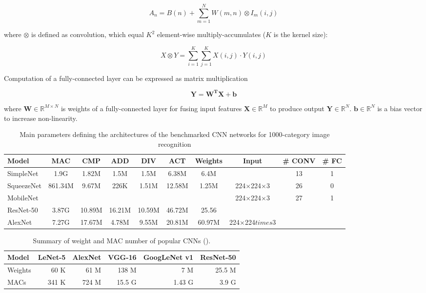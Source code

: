 \[
A_n = B(n) + \sum_{m=1}^NW(m,n) \otimes I_m(i,j)
\]

\noindent 
where $\otimes$ is defined as convolution, which equal $K^2$ element-wise multiply-accumulates ($K$ is the kernel size):

\[
X \otimes Y = \sum_{i=1}^K\sum_{j=1}^KX(i,j)\cdot Y(i,j)
\]


Computation of a fully-connected layer can be expressed as matrix multiplication

\[
\mathbf{Y} = \mathbf{W^TX+b}
\]

\noindent 
where $\mathbf{W}\in \mathbb{R}^{M\times N}$ is weights of a fully-connected layer for fusing input features $\mathbf{X}\in \mathbb{R}^M$ to produce output $\mathbf{Y}\in \mathbb{R}^N$. $\mathbf{b}\in \mathbb{R}^N$ is a bias vector to increase non-linearity.


\begin{table}[h]
\renewcommand{\arraystretch}{.75}
\footnotesize
\centering
\caption{Main parameters defining the architectures of the benchmarked CNN networks for 1000-category image recognition \cite{Montero2018}\cite{Hasanpour2016}}
\begin{tabular}{lccccccccc}
\toprule
\textbf{Model}	&	\textbf{MAC}	&	\textbf{CMP}	&	\textbf{ADD}	&	\textbf{DIV}	&	\textbf{ACT}	&	\textbf{Weights}	&	\textbf{Input}	&	\textbf{\# CONV}	&	\textbf{\# FC}	\\
\midrule
SimpleNet	&	1.9G	&	1.82M	&	1.5M	&	1.5M	&	6.38M	&	6.4M	&		&	13	&	1 \\
SqueezeNet	&861.34M	&	9.67M	&	226K	&	1.51M	&	12.58M	&	1.25M	&	224$\times$224$\times$3 &	26	&	0	\\
MobileNet	&			&			&			&			&			&			&	224$\times$224$\times$3	&	27	&	1	\\
ResNet-50	&	3.87G	&	10.89M	&	16.21M	&	10.59M	&	46.72M	&	25.56&	\\
AlexNet		&	7.27G	&	17.67M	&	4.78M	&	9.55M	&	20.81M	&	60.97M	&	224$\times$224$
times$3 \\
\bottomrule
\end{tabular}
\end{table}




\begin{table}[h]
\renewcommand{\arraystretch}{.75}
\centering
\caption{ Summary of weight and MAC number of popular CNNs (\cite{Sze2017}).}
\begin{tabular}{lrrrrr}
\toprule
\textbf{Model} & \textbf{LeNet-5} &  \textbf{AlexNet} & \textbf{VGG-16} & \textbf{GoogLeNet v1} & \textbf{ResNet-50} \\
\midrule
Weights	&	60 K	&	61 M	&	138 M	&	7 M	&	25.5 M \\
MACs	&	341 K	&	724 M	&	15.5 G	&	1.43 G	&	3.9 G \\
\bottomrule
\end{tabular}
\end{table}



